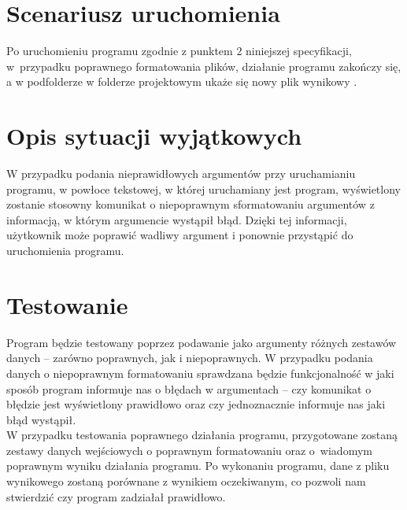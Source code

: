 \documentclass[12pt,a4paper]{article}
\begin{document}
\section{Scenariusz uruchomienia}
Po uruchomieniu programu zgodnie z punktem 2 niniejszej specyfikacji, w~przypadku poprawnego formatowania plików, działanie programu zakończy się, a w podfolderze  w folderze projektowym ukaże się nowy plik wynikowy .
\section{Opis sytuacji wyjątkowych}
W przypadku podania nieprawidłowych argumentów przy uruchamianiu programu, w powłoce tekstowej, w której uruchamiany jest program, wyświetlony zostanie stosowny komunikat o niepoprawnym sformatowaniu argumentów z informacją, w którym argumencie wystąpił błąd. Dzięki tej informacji, użytkownik może poprawić wadliwy argument i ponownie przystąpić do uruchomienia programu.
\section{Testowanie}
Program będzie testowany poprzez podawanie jako argumenty różnych zestawów danych -- zarówno poprawnych, jak i niepoprawnych. W przypadku podania danych o niepoprawnym formatowaniu sprawdzana będzie funkcjonalność w jaki sposób program informuje nas o błędach w argumentach -- czy komunikat o błędzie jest wyświetlony prawidłowo oraz czy jednoznacznie informuje nas jaki błąd wystąpił.\\
\indent W przypadku testowania poprawnego działania programu, przygotowane zostaną zestawy danych wejściowych o poprawnym formatowaniu oraz o~wiadomym poprawnym wyniku działania programu. Po wykonaniu programu, dane z pliku wynikowego zostaną porównane z wynikiem oczekiwanym, co pozwoli nam stwierdzić czy program zadziałał prawidłowo.
\end{document}
